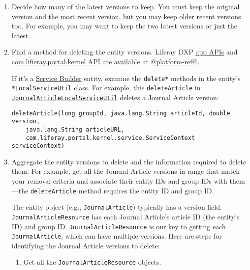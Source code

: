 \begin{enumerate}
\def\labelenumi{\arabic{enumi}.}
\item
  Decide how many of the latest versions to keep. You must keep the
  original version and the most recent version, but you may keep older
  recent versions too. For example, you may want to keep the two latest
  versions or just the latest.
\item
  Find a method for deleting the entity versions. Liferay DXP
  \href{@app-ref@/apps/}{app APIs} and
  \href{@platform-ref@/7.2-latest/javadocs/portal-kernel/}{com.lifieray.portal.kernel
  API} are available at \href{@platform-ref@}{@platform-ref@}.

  If it's a
  \href{/docs/7-2/appdev/-/knowledge_base/a/service-builder}{Service
  Builder} entity, examine the \texttt{delete*} methods in the entity's
  \texttt{*LocalServiceUtil} class. For example, this
  \texttt{deleteArticle} in
  \href{@app-ref@/web-experience/latest/javadocs/com/liferay/journal/service/JournalArticleLocalServiceUtil.html\#deleteArticle-long-java.lang.String-double-java.lang.String-com.liferay.portal.kernel.service.ServiceContext-}{\texttt{JournalArticleLocalServiceUtil}}
  deletes a Journal Article version:

\begin{verbatim}
deleteArticle(long groupId, java.lang.String articleId, double version, 
    java.lang.String articleURL, 
    com.liferay.portal.kernel.service.ServiceContext serviceContext)
\end{verbatim}
\item
  Aggregate the entity versions to delete and the information required
  to delete them. For example, get all the Journal Article versions in
  range that match your removal criteria and associate their entity IDs
  and group IDs with them---the \texttt{deleteArticle} method requires
  the entity ID and group ID.

  The entity object (e.g., \texttt{JournalArticle}) typically has a
  version field. \texttt{JournalArticleResource} has each Journal
  Article's article ID (the entity's ID) and group ID.
  \texttt{JournalArticleResource} is our key to getting each
  \texttt{JournalArticle}, which can have multiple versions. Here are
  steps for identifying the Journal Article versions to delete:

  \begin{enumerate}
  \def\labelenumii{\arabic{enumii}.}
  \tightlist
  \item
    Get all the \texttt{JournalArticleResource} objects.
  \end{enumerate}


\end{enumerate}
